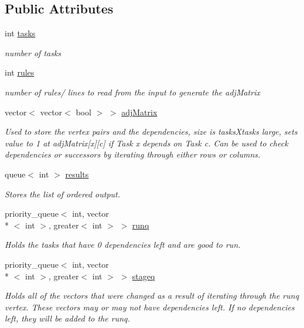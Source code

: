 \subsection*{Public Attributes}
\begin{DoxyCompactItemize}
\item 
int \hyperlink{structGraph_a4d2a4b0944a121f0415137f0f1538e4a}{tasks}
\begin{DoxyCompactList}\small\item\em number of tasks \end{DoxyCompactList}\item 
int \hyperlink{structGraph_a7d540d84c08510deb0f2b0692ed5afcd}{rules}
\begin{DoxyCompactList}\small\item\em number of rules/ lines to read from the input to generate the adj\+Matrix \end{DoxyCompactList}\item 
vector$<$ vector$<$ bool $>$ $>$ \hyperlink{structGraph_a25439b7cad72199504e1fdd1fbe70130}{adj\+Matrix}
\begin{DoxyCompactList}\small\item\em Used to store the vertex pairs and the dependencies, size is tasks\+Xtasks large, sets value to 1 at adj\+Matrix\mbox{[}x\mbox{]}\mbox{[}c\mbox{]} if Task x depends on Task c. Can be used to check dependencies or successors by iterating through either rows or columns. \end{DoxyCompactList}\item 
queue$<$ int $>$ \hyperlink{structGraph_a97da3b3f97afbd334c70b354a3be4551}{results}
\begin{DoxyCompactList}\small\item\em Stores the list of ordered output. \end{DoxyCompactList}\item 
priority\+\_\+queue$<$ int, vector\\*
$<$ int $>$, greater$<$ int $>$ $>$ \hyperlink{structGraph_af6491f1c520f1cbff611984f0da0167a}{runq}
\begin{DoxyCompactList}\small\item\em Holds the tasks that have 0 dependencies left and are good to run. \end{DoxyCompactList}\item 
priority\+\_\+queue$<$ int, vector\\*
$<$ int $>$, greater$<$ int $>$ $>$ \hyperlink{structGraph_a8e75929d511a2d1808f89b7a899c6f12}{stageq}
\begin{DoxyCompactList}\small\item\em Holds all of the vectors that were changed as a result of iterating through the runq vertex. These vectors may or may not have dependencies left. If no dependencies left, they will be added to the runq. \end{DoxyCompactList}\item 

\end{DoxyCompactItemize}
